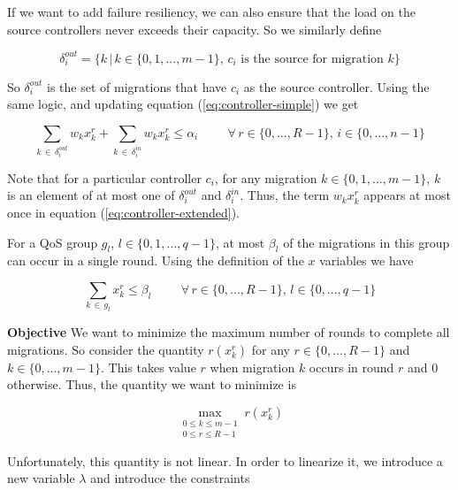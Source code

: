 \documentclass[letterpaper,12pt,titlepage,oneside,final]{article}
\begin{document}
If we want to add failure resiliency, we can also ensure that the load on the source controllers never exceeds their capacity. So we similarly define

$$\delta^{out}_{i} = \{k \, | \, k \in \{0, 1, ..., m-1\}, \, c_{i} \text{ is the source for migration } k\}$$

So $\delta^{out}_{i}$ is the set of migrations that have $c_{i}$ as the source controller. Using the same logic, and updating equation (\ref{eq:controller-simple}) we get

\begin{equation}\label{eq:controller-extended}
    \sum_{k \, \in \, \delta^{out}_{i}} w_{k}x^{r}_{k} + \sum_{k \, \in \, \delta^{in}_{i}} w_{k}x^{r}_{k} \leq \alpha_{i} \hspace{1cm} \forall \, r \in \{0, ..., R-1\}, \, i \in \{0, ..., n-1\}
\end{equation}

Note that for a particular controller $c_{i}$, for any migration $k \in \{0, 1, ..., m-1\}$, $k$ is an element of at most one of $\delta^{out}_{i}$ and $\delta^{in}_{i}$. Thus, the term $w_{k}x^{r}_{k}$ appears at most once in equation (\ref{eq:controller-extended}).

\noindent For a QoS group $g_{l}$, $l \in \{0, 1, ..., q-1\}$, at most $\beta_{l}$ of the migrations in this group can occur in a single round. Using the definition of the $x$ variables we have

\begin{equation}\label{eq:qos-constraint}
    \sum_{k \, \in \, g_{l}} x^{r}_{k} \leq \beta_{l} \hspace{1cm} \forall \, r \in \{0, ..., R - 1\}, \, l \in \{0, ..., q-1\}
\end{equation}

\noindent\textbf{Objective}\newline
We want to minimize the maximum number of rounds to complete all migrations. So consider the quantity $r(x^{r}_{k})$ for any $r \in \{0, ..., R - 1\}$ and $k \in \{0, ..., m - 1\}$. This takes value $r$ when migration $k$ occurs in round $r$ and 0 otherwise. Thus, the quantity we want to minimize is

$$\max_{\substack{0 \leq k \leq m - 1 \\ 0 \leq r \leq R - 1}} r(x^{r}_{k})$$

Unfortunately, this quantity is not linear. In order to linearize it, we introduce a new variable $\lambda$ and introduce the constraints
\end{document}
